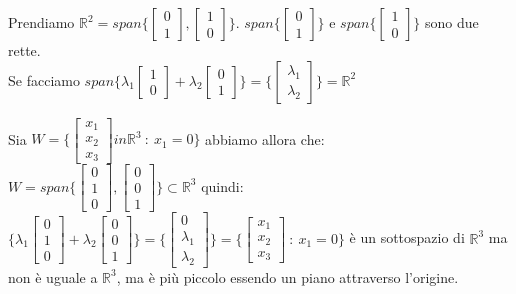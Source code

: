 \begin{example}
Prendiamo $\mathbb{R}^2 = span\Big\{\begin{bmatrix}0\\1\end{bmatrix},\begin{bmatrix}1\\0\end{bmatrix}\Big\}$. $span\Big\{\begin{bmatrix}0\\1\end{bmatrix}\Big\}$ e $span\Big\{\begin{bmatrix}1\\0\end{bmatrix}\Big\}$ sono due rette.\\
Se facciamo $span\Big\{\lambda_1 \begin{bmatrix}1\\0\end{bmatrix} + \lambda_2 \begin{bmatrix}0\\1\end{bmatrix}\Big\} = \Big\{\begin{bmatrix}\lambda_1\\\lambda_2\end{bmatrix}\Big\} = \mathbb{R}^2$
\end{example}

\begin{example}
Sia $W = \Big\{\begin{bmatrix}x_1\\x_2\\x_3\end{bmatrix} in \mathbb{R}^3 \: : \: x_1 = 0\Big\}$ abbiamo allora che:
$W = span\Big\{\begin{bmatrix}0\\1\\0\end{bmatrix}, \begin{bmatrix}0\\0\\1\end{bmatrix} \Big\} \subset \mathbb{R}^3$ quindi: $\Big \{\lambda_1 \begin{bmatrix}0\\1\\0\end{bmatrix} + \lambda_2 \begin{bmatrix}0\\0\\1\end{bmatrix}\} = \{\begin{bmatrix}0\\\lambda_1 \\ \lambda_2\end{bmatrix}\} = \{\begin{bmatrix}x_1\\x_2\\x_3\end{bmatrix}\: : \: x_1=0\}$ è un sottospazio di $\mathbb{R}^3$ ma non è uguale a $\mathbb{R}^3$, ma è più piccolo essendo un piano attraverso l'origine.
\end{example}


